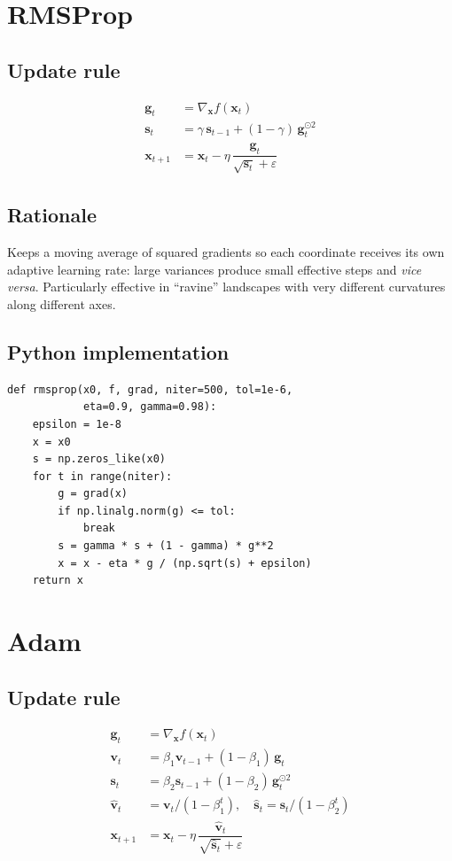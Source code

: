 \documentclass[12pt]{article}
\begin{document}
\section{RMSProp}
\subsection*{Update rule}
\begin{align}
\bm g_t &= \nabla_{\!\bm x}f(\bm x_t) \\
\bm s_t &= \gamma\,\bm s_{t-1} + (1-\gamma)\,\bm g_t^{\odot 2} \\
\bm x_{t+1} &= \bm x_t - \eta\,\dfrac{\bm g_t}{\sqrt{\bm s_t}+\varepsilon}
\end{align}

\subsection*{Rationale}
Keeps a moving average of squared gradients so each coordinate receives its
own adaptive learning rate: large variances produce small effective steps and
\emph{vice versa}.  Particularly effective in ``ravine'' landscapes with very
different curvatures along different axes.

\subsection*{Python implementation}
\begin{lstlisting}
def rmsprop(x0, f, grad, niter=500, tol=1e-6,
            eta=0.9, gamma=0.98):
    epsilon = 1e-8
    x = x0
    s = np.zeros_like(x0)
    for t in range(niter):
        g = grad(x)
        if np.linalg.norm(g) <= tol:
            break
        s = gamma * s + (1 - gamma) * g**2
        x = x - eta * g / (np.sqrt(s) + epsilon)
    return x
\end{lstlisting}

\section{Adam}
\subsection*{Update rule}
\begin{align}
\bm g_t      &= \nabla_{\!\bm x}f(\bm x_t) \\
\bm v_t      &= \beta_1 \bm v_{t-1} + (1-\beta_1)\,\bm g_t \\
\bm s_t      &= \beta_2 \bm s_{t-1} + (1-\beta_2)\,\bm g_t^{\odot 2} \\
\hat{\bm v}_t&= \bm v_t / (1-\beta_1^{t}),\quad
\hat{\bm s}_t= \bm s_t / (1-\beta_2^{t}) \\[4pt]
\bm x_{t+1}  &= \bm x_t -
               \eta\,\dfrac{\hat{\bm v}_t}{\sqrt{\hat{\bm s}_t}+\varepsilon}
\end{align}
\end{document}
